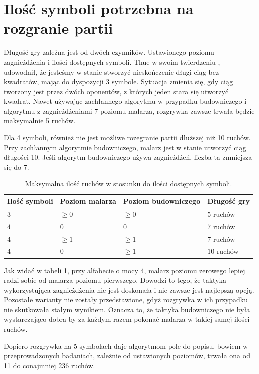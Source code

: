 \documentclass[document]{xmgr}
\begin{document}
\section{Ilość symboli potrzebna na rozgranie partii}
Długość gry zależna jest od dwóch czynników. Ustawionego poziomu zagnieżdżenia i ilości dostępnych symboli. Thue w swoim twierdzeniu \cite{repetition}, udowodnił, że jesteśmy w stanie stworzyć nieskończenie długi ciąg bez kwadratów, mając do dyspozycji 3 symbole. Sytuacja zmienia się, gdy ciąg tworzony jest przez dwóch oponentów, z których jeden stara się utworzyć kwadrat. Nawet używając zachłannego algorytmu w przypadku budowniczego i algorytmu z zagnieżdżeniami 7 poziomu malarza, rozgrywka zawsze trwała będzie maksymalnie 5 ruchów. 

Dla 4 symboli, również nie jest możliwe rozegranie partii dłuższej niż 10 ruchów. Przy zachłannym algorytmie budowniczego, malarz jest w stanie utworzyć ciąg długości 10. Jeśli algorytm budowniczego używa zagnieżdżeń, liczba ta zmniejsza się do 7.

\begin{table}[tbh]
    \centering
	\begin{tabular}{|l|l|l|l|} \hline
	Ilość symboli & Poziom malarza & Poziom budowniczego & Długość gry \\ \hline
	$3$ & $\geq 0$ & $\geq 0$ & $5$ ruchów\\ \hline
	$4$ & $0$ & $0$ & $7$ ruchów\\ \hline
	$4$ & $\geq 1 $ & $\geq 1$ & $7$ ruchów\\ \hline
	$4$ & $0$ & $\geq 1$ & $10$ ruchów\\ \hline
	\end{tabular}
	\caption{Maksymalna ilość ruchów w stosunku do ilości dostępnych symboli.}
	\label{fig:maxGameLength}
\end{table}

Jak widać w tabeli \ref{fig:maxGameLength}, przy alfabecie o mocy 4, malarz poziomu zerowego lepiej radzi sobie  od malarza poziomu pierwszego. Dowodzi to tego, że taktyka wykorzystująca zagnieżdżenia nie jest doskonała i nie zawsze jest najlepszą opcją. Pozostałe warianty nie zostały przedstawione, gdyż rozgrywka w ich przypadku nie skutkowała stałym wynikiem. Oznacza to, że taktyka budowniczego nie była wystarczająco dobra by za każdym razem pokonać malarza w takiej samej ilości ruchów.


Dopiero rozgrywka na 5 symbolach daje algorytmom pole do popisu, bowiem w przeprowadzonych badaniach, zależnie od ustawionych poziomów, trwała ona od 11 do conajmniej 236 ruchów.
\end{document}
